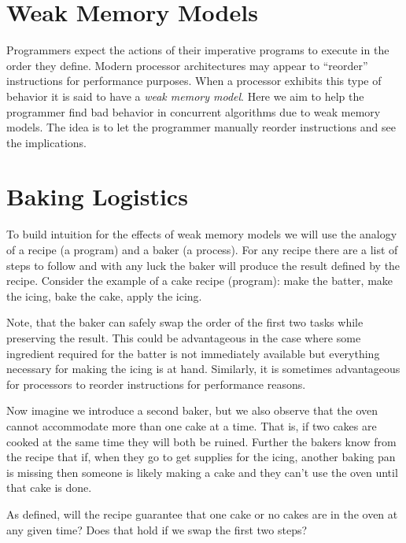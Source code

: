 \documentclass[9pt,twocolumn]{extarticle}
\begin{document}
\section{Weak Memory Models}
\vspace{-0.25cm}
Programmers expect the actions of their imperative programs to execute in the order they define. Modern processor architectures may appear to ``reorder'' instructions for performance purposes. When a processor exhibits this type of behavior it is said to have a \textit{weak memory model}. Here we aim to help the programmer find bad behavior in concurrent algorithms due to weak memory models. The idea is to let the programmer manually reorder instructions and see the implications.

\vspace{-0.35cm}
\section{Baking Logistics}
\vspace{-0.25cm}

To build intuition for the effects of weak memory models we will use the analogy of a recipe (a program) and a baker (a process). For any recipe there are a list of steps to follow and with any luck the baker will produce the result defined by the recipe. Consider the example of a cake recipe (program): make the batter, make the icing, bake the cake, apply the icing.

Note, that the baker can safely swap the order of the first two tasks while preserving the result. This could be advantageous in the case where some ingredient required for the batter is not immediately available but everything necessary for making the icing is at hand. Similarly, it is sometimes advantageous for processors to reorder instructions for performance reasons.

Now imagine we introduce a second baker, but we also observe that the oven cannot accommodate more than one cake at a time. That is, if two cakes are cooked at the same time they will both be ruined. Further the bakers know from the recipe that if, when they go to get supplies for the icing, another baking pan is missing then someone is likely making a cake and they can't use the oven until that cake is done.

As defined, will the recipe guarantee that one cake or no cakes are in the oven at any given time? Does that hold if we swap the first two steps?
\end{document}
